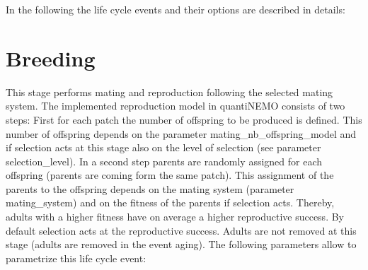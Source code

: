 \documentclass[letterpaper,12pt,oneside]{book}
\begin{document}
In the following the life cycle events and their options are described in details:

\section{Breeding}\label{1breeding}
This stage performs mating and reproduction following the selected mating system. The implemented reproduction model in quantiNEMO consists of two steps: First for each patch the number of offspring to be produced is defined. This number of offspring depends on the parameter \textsf{mating\_nb\_offspring\_model} and if selection acts at this stage also on the level of selection (see parameter \textsf{selection\_level}). In a second step parents are randomly assigned for each offspring (parents are coming form the same patch). This assignment of the parents to the offspring depends on the mating system (parameter \textsf{mating\_system}) and on the fitness of the parents if selection acts. Thereby, adults with a higher fitness have on average a higher reproductive success. By default selection acts at the reproductive success. Adults are not removed at this stage (adults are removed in the event \textsf{aging}). The following parameters allow to parametrize this life cycle event:
 
\end{document}
